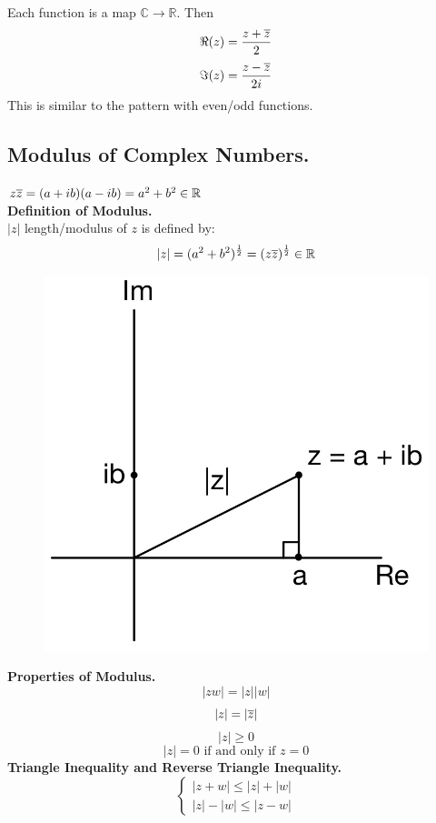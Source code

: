 \documentclass[11pt]{article}
\begin{document}
Each function is a map $\mathbb{C} \to \mathbb{R}$. Then 
$$\Re(z) = \frac{z + \overline{z}}{2}$$
$$\Im(z) = \frac{z - \overline{z}}{2i}$$
This is similar to the pattern with even/odd functions. 

\subsection{Modulus of Complex Numbers.}
$z\overline{z} = (a + ib)(a - ib) = a^2 + b^2 \in \mathbb{R}$  \\

\textbf{Definition of Modulus.} \\
$|z|$ length/modulus of $z$ is defined by:
$$|z| = (a^2 + b^2)^{\frac{1}{2}} = (z\overline{z})^{\frac{1}{2}} \in \mathbb{R}$$
\begin{figure}[H]
\includegraphics[scale = 0.19]{1_3}
\centering
\end{figure}
\textbf{Properties of Modulus.} \\
$$|zw| = |z||w|$$ 
$$|z| = |\overline{z}|$$  
$$|z| \geqslant 0$$
\begin{equation*}
|z| = 0 \mbox{ if and only if } z = 0
\end{equation*}
\newline
\textbf{Triangle Inequality and Reverse Triangle Inequality.} \\

\[ \begin{cases} 
      |z + w| \leqslant |z| + |w| \\
      |z| - |w| \leqslant |z - w|
   \end{cases}
\]
\end{document}
